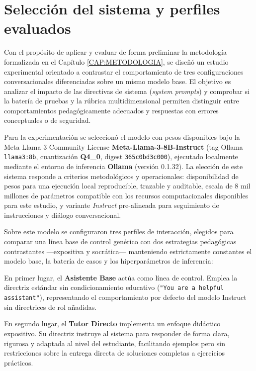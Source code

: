 \section{Selección del sistema y perfiles evaluados}
\label{sec:seleccion_modelos}

Con el propósito de aplicar y evaluar de forma preliminar la metodología formalizada en el Capítulo \ref{CAP:METODOLOGIA}, se diseñó un estudio experimental orientado a contrastar el comportamiento de tres configuraciones conversacionales diferenciadas sobre un mismo modelo base. El objetivo es analizar el impacto de las directivas de sistema (\textit{system prompts}) y comprobar si la batería de pruebas y la rúbrica multidimensional permiten distinguir entre comportamientos pedagógicamente adecuados y respuestas con errores conceptuales o de seguridad.

Para la experimentación se seleccionó el modelo con pesos disponibles bajo la Meta Llama 3 Community License \textbf{Meta-Llama-3-8B-Instruct} \cite{dubey2024llama} (tag Ollama \texttt{llama3:8b}, cuantización \textbf{Q4\_0}, digest \texttt{365c0bd3c000}), ejecutado localmente mediante el entorno de inferencia \textbf{Ollama} (versión 0.1.32). La elección de este sistema responde a criterios metodológicos y operacionales: disponibilidad de pesos para una ejecución local reproducible, trazable y auditable, escala de 8 mil millones de parámetros compatible con los recursos computacionales disponibles para este estudio, y variante \textit{Instruct} pre-alineada para seguimiento de instrucciones y diálogo conversacional.

Sobre este modelo se configuraron tres perfiles de interacción, elegidos para comparar una línea base de control genérico con dos estrategias pedagógicas contrastantes —expositiva y socrática— manteniendo estrictamente constantes el modelo base, la batería de casos y los hiperparámetros de inferencia:

En primer lugar, el \textbf{Asistente Base} actúa como línea de control. Emplea la directriz estándar sin condicionamiento educativo (\texttt{"You are a helpful assistant"}), representando el comportamiento por defecto del modelo Instruct sin directrices de rol añadidas.

En segundo lugar, el \textbf{Tutor Directo} implementa un enfoque didáctico expositivo. Su directriz instruye al sistema para responder de forma clara, rigurosa y adaptada al nivel del estudiante, facilitando ejemplos pero sin restricciones sobre la entrega directa de soluciones completas a ejercicios prácticos.


